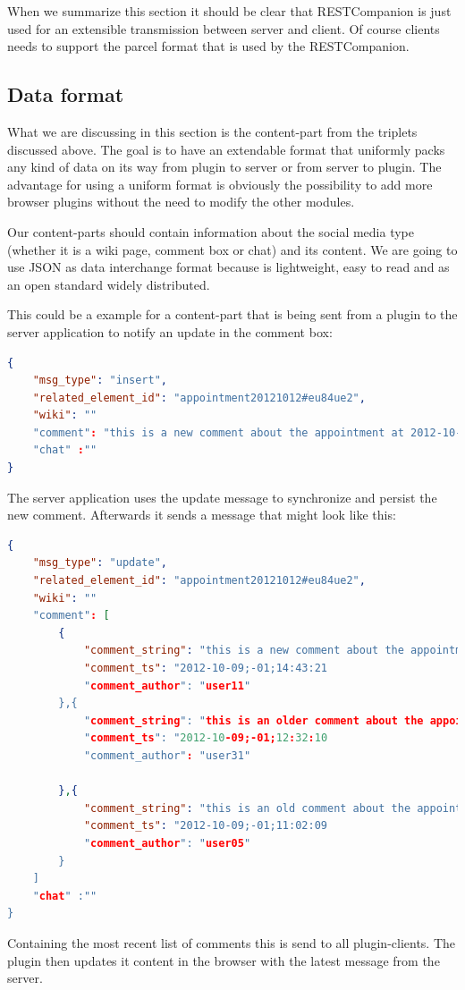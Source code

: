 When we summarize this section it should be clear that RESTCompanion is just used for an extensible  transmission between server and client. Of course clients needs to support the parcel format that is used by the RESTCompanion.

\subsection*{Data format}
What we are discussing in this section is the content-part from the triplets discussed above. The goal is to have an extendable format that uniformly packs any kind of data on its way from plugin to server or from server to plugin. The advantage for using a uniform format is obviously the possibility to add more browser plugins without the need to modify the other modules. 

Our content-parts should contain information about the social media type (whether it is a wiki page, comment box or chat) and its content. We are going to use JSON as data interchange format because is lightweight, easy to read and as an open standard widely distributed.

This could be a example for a content-part that is being sent from a plugin to the server application to notify an update in the comment box:

\begin{lstlisting}[language=json]
{
    "msg_type": "insert",
	"related_element_id": "appointment20121012#eu84ue2",
	"wiki": ""
	"comment": "this is a new comment about the appointment at 2012-10-12"
	"chat" :""
}
\end{lstlisting}

The server application uses the update message to synchronize and persist the new comment. Afterwards it sends a message that might look like this:
\begin{lstlisting}[language=json]
{
    "msg_type": "update",
	"related_element_id": "appointment20121012#eu84ue2",
	"wiki": ""
	"comment": [
		{
			"comment_string": "this is a new comment about the appointment at 2012-10-12",
			"comment_ts": "2012-10-09;-01;14:43:21
			"comment_author": "user11"
		},{
			"comment_string": "this is an older comment about the appointment at 2012-10-12",
			"comment_ts": "2012-10-09;-01;12:32:10
			"comment_author": "user31"
		
		},{
			"comment_string": "this is an old comment about the appointment at 2012-10-12",
			"comment_ts": "2012-10-09;-01;11:02:09
			"comment_author": "user05"
		}
	]
	"chat" :""	
}
\end{lstlisting}

Containing the most recent list of comments this is send to all plugin-clients. The plugin then updates it content in the browser with the latest message from the server.
